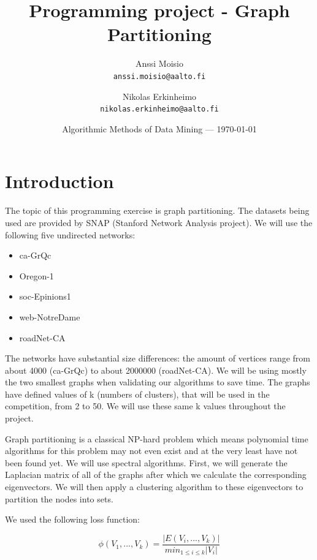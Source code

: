 \documentclass{article}
\title{Programming project - Graph Partitioning} %
\author{
  Anssi Moisio\\
  \texttt{anssi.moisio@aalto.fi}
  \and
  Nikolas Erkinheimo\\
  \texttt{nikolas.erkinheimo@aalto.fi}
}
\date{Algorithmic Methods of Data Mining --- \today} %
\begin{document}
\maketitle %



\section*{Introduction} %

The topic of this programming exercise is graph partitioning.
The datasets being used are provided by SNAP (Stanford Network Analysis project).
We will use the following five undirected networks:

\begin{itemize}
	\item ca-GrQc 
	\item Oregon-1
	\item soc-Epinions1
	\item web-NotreDame
	\item roadNet-CA
\end{itemize}

The networks have substantial size differences: the amount of vertices range from
about 4000 (ca-GrQc) to about 2000000 (roadNet-CA). We will be using mostly
the two smallest graphs when validating our algorithms to save time.
The graphs have defined values of k (numbers of clusters), that will be used in
the competition, from 2 to 50. We will use these same k values throughout the project.

Graph partitioning is a classical NP-hard problem which means polynomial time algorithms for this problem may not even exist and at the very least have not been found yet. We will use spectral algorithms. First, we will generate the Laplacian matrix of all of the graphs after which we calculate the corresponding eigenvectors. We will then apply a clustering algorithm to these eigenvectors to partition the nodes into sets.

We used the following loss function:

\begin{equation}
	\phi(V_1,...,V_k) = \frac{\lvert{E(V_i,...,V_k)}\rvert}{min_{1\leq{i}\leq{k}}\lvert{V_i}\rvert}
\end{equation}
\end{document}
